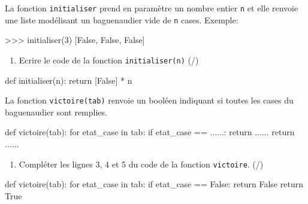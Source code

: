  La fonction \texttt{initialiser} prend en paramètre un nombre entier \texttt{n} et elle renvoie une liste modélisant un baguenaudier vide de \texttt{n} cases. Exemple:

    \begin{CodePythontexAlt}[TaillePolice=\large, Largeur=1\linewidth,Centre,Lignes=true,PremLigne=1]{}
    >>> initialiser(3)
    [False, False, False]
\end{CodePythontexAlt}

\pagebreak

\begin{enumerate}[resume=monDS]
\item Ecrire le code de la fonction \texttt{initialiser(n)} (/)
\end{enumerate}

\begin{blocvisible}[height=3]
    \begin{CodePythontexAlt}[TaillePolice=\large, Largeur=1\linewidth,Centre,Lignes=true,PremLigne=1]{}
    def initialiser(n):
        return [False] * n
    \end{CodePythontexAlt}
\end{blocvisible}

\medskip

 La fonction \texttt{victoire(tab)} renvoie un booléen indiquant si toutes les cases du baguenaudier sont remplies.

    \begin{CodePythontexAlt}[TaillePolice=\large, Largeur=1\linewidth,Centre,Lignes=true,PremLigne=1]{}
def victoire(tab):
    for etat_case in tab:
        if etat_case == ......:
            return ......
    return ......

    \end{CodePythontexAlt}


        \begin{enumerate}[resume=monDS]
\item Compléter les lignes 3, 4 et 5 du code de la fonction \texttt{victoire}.  (/)
\end{enumerate}

\begin{blocvisible}[height=4]
    \begin{CodePythontexAlt}[TaillePolice=\large, Largeur=1\linewidth,Centre,Lignes=true,PremLigne=1]{}
    def victoire(tab):
        for etat_case in tab:
            if etat_case == False:
                return False
        return True
    \end{CodePythontexAlt}
\end{blocvisible}

